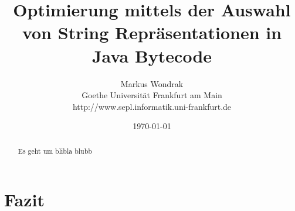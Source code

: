 \documentclass[12pt]{report}
\title{Optimierung mittels der Auswahl von String Repräsentationen in Java Bytecode}
\author{Markus Wondrak\\Goethe Universität Frankfurt am Main\\http://www.sepl.informatik.uni-frankfurt.de}
\date{\today}
\begin{document}
\maketitle
{}
\tableofcontents
\listoffigures
\listofalgorithms

\begin{abstract}
Es geht um blibla blubb
\end{abstract}








\chapter{Fazit}
\end{document}
